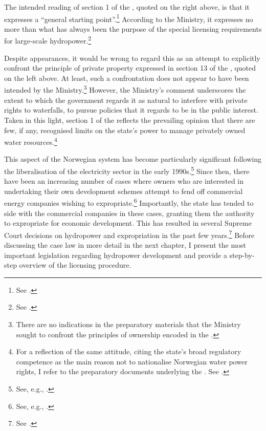 The intended reading of section 1 of the \cite{ica17}, quoted on the right above, is that it expresses a ``general starting point''.\footnote{See \cite[72]{otprp61}.} According to the Ministry, it expresses no more than what has always been the purpose of the special licensing requirements for large-scale hydropower.\footnote{See \cite[72]{otprp61}.}

Despite appearances, it would be wrong to regard this as an attempt to explicitly confront the principle of private property expressed in section 13 of the \cite{wra00}, quoted on the left above. At least, such a confrontation does not appear to have been intended by the Ministry.\footnote{There are no indications in the preparatory materials that the Ministry sought to confront the principles of ownership encoded in the \cite{wra00}.} However, the Ministry's comment underscores the extent to which the government regards it as natural to interfere with private rights to waterfalls, to pursue policies that it regards to be in the public interest. Taken in this light, section 1 of the \cite{ica17} reflects the prevailing opinion that there are few, if any, recognised limits on the state's power to manage privately owned water resources.\footnote{For a reflection of the same attitude, citing the state's broad regulatory competence as the main reason not 
to nationalise Norwegian water power rights, I refer to the preparatory documents underlying the \cite{wra00}. See \cite[152-153]{nou94}.}

This aspect of the Norwegian system has become particularly significant following the liberalisation of the electricity sector in the early 1990s.\footnote{See, e.g., \cite{larsen06}.} Since then, there have been an increasing number of cases where owners who are interested in undertaking their own development schemes attempt to fend off commercial energy companies wishing to expropriate.\footnote{See, e.g., \cite{sofienlund07}.} Importantly, the state has tended to side with the commercial companies in these cases, granting them the authority to expropriate for economic development. This has resulted in several Supreme Court decisions on hydropower and expropriation in the past few years.\footnote{See \cite{uleberg08,otra10,jorpeland11,klovtveit11,otra13}.} Before discussing the case law in more detail in the next chapter, I present the most important legislation regarding hydropower development and provide a step-by-step overview of the licensing procedure. %

